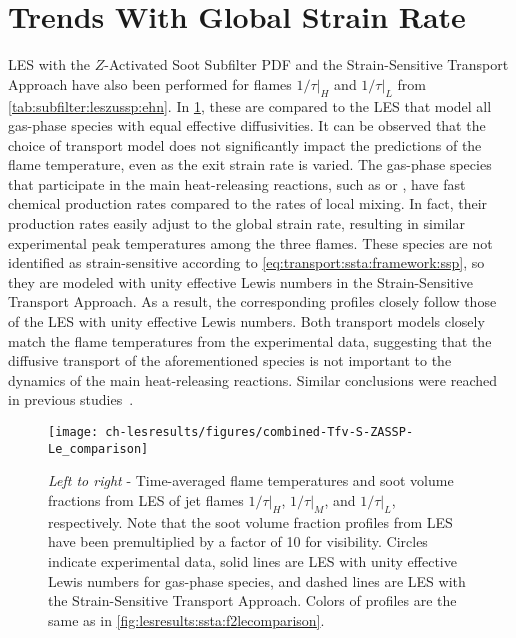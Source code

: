 \section{Trends With Global Strain Rate}
\label{sec:lesresults:strain}

LES with the $Z$-Activated Soot Subfilter PDF and the Strain-Sensitive Transport Approach have also been performed for flames $1/\tau|_H$ and $1/\tau|_L$ from \cref{tab:subfilter:leszussp:ehn}. In \cref{fig:lesresults:strain:allflameslecomparison}, these are compared to the LES that model all gas-phase species with equal effective diffusivities. It can be observed that the choice of transport model does not significantly impact the predictions of the flame temperature, even as the exit strain rate is varied. The gas-phase species that participate in the main heat-releasing reactions, such as  or , have fast chemical production rates compared to the rates of local mixing. In fact, their production rates easily adjust to the global strain rate, resulting in similar experimental peak temperatures among the three flames. These species are not identified as strain-sensitive according to \cref{eq:transport:ssta:framework:ssp}, so they are modeled with unity effective Lewis numbers in the Strain-Sensitive Transport Approach. As a result, the corresponding profiles closely follow those of the LES with unity effective Lewis numbers. Both transport models closely match the flame temperatures from the experimental data, suggesting that the diffusive transport of the aforementioned species is not important to the dynamics of the main heat-releasing reactions. Similar conclusions were reached in previous studies~\cite{attili2015,attili2016}.

\begin{figure}[htb]
  \centering
  \texttt{[image: ch-lesresults/figures/combined-Tfv-S-ZASSP-Le\_comparison]}
  \caption[Centerline \texorpdfstring{$\langle T \rangle$}{<T>} \& \texorpdfstring{$\langle f_V \rangle$}{<fV>} from LES of Flames \texorpdfstring{$1/\tau|_H$}{1/t|H}, \texorpdfstring{$1/\tau|_M$}{1/t|M}, and \texorpdfstring{$1/\tau|_L$}{1/t|L} with Various Transport Approaches]{\textit{Left to right} - Time-averaged flame temperatures and soot volume fractions from LES of jet flames $1/\tau|_H$, $1/\tau|_M$, and $1/\tau|_L$, respectively. Note that the soot volume fraction profiles from LES have been premultiplied by a factor of 10 for visibility. Circles indicate experimental data, solid lines are LES with unity effective Lewis numbers for gas-phase species, and dashed lines are LES with the Strain-Sensitive Transport Approach. Colors of profiles are the same as in \cref{fig:lesresults:ssta:f2lecomparison}.}
  \label{fig:lesresults:strain:allflameslecomparison}
\end{figure}

